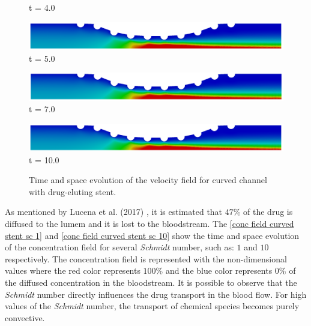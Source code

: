 \begin{figure}[H]
\begin{minipage}{.50\linewidth}
      t = 4.0
     \end{minipage}%
     \begin{minipage}{.50\linewidth}
      \centering
      \includegraphics[scale=0.12]{./02_chaps/cap_solution/figure/vel_CurvedStrut10000.png}\\
      t = 5.0
     \end{minipage}
     \begin{minipage}{.50\linewidth}
     \medskip
      \centering
      \includegraphics[scale=0.12]{./02_chaps/cap_solution/figure/vel_CurvedStrut14000.png}\\
      t = 7.0
     \end{minipage}%
     \begin{minipage}{.50\linewidth}
     \medskip
      \centering
      \includegraphics[scale=0.12]{./02_chaps/cap_solution/figure/vel_CurvedStrut20000.png}\\
      t = 10.0
     \end{minipage}
     \medskip
     \caption{
Time and space evolution of the velocity field for curved channel with
drug-eluting stent.}
     \label{velocity field curved stent}
\end{figure}


\vspace{1cm}
As mentioned by Lucena et al. (2017) \cite{lucena2017}, 
it is estimated that $47$\% of the drug is diffused to the 
lumem and it is lost to the bloodstream.
The \ref{conc field curved stent sc 1} and 
\ref{conc field curved stent sc 10} show the time and space evolution 
of the concentration field for several \textit{Schmidt} number, 
such as: $1$ and $10$ respectively. The concentration field is 
represented with the non-dimensional values where the red color 
represents $100$\% and the blue color represents $0$\% 
of the diffused concentration in the bloodstream. 
It is possible to observe that the \textit{Schmidt} number directly 
influences the drug transport in the blood flow. 
For high values of the \textit{Schmidt} number, 
the transport of chemical species becomes purely convective.

